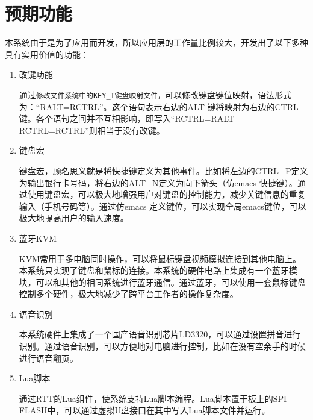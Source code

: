 \section{预期功能}
本系统由于是为了应用而开发，所以应用层的工作量比例较大，开发出了以下多种具有实用价值的功能：
\begin{enumerate}
\item 改键功能

通过\verb|修改文件系统中的KEY_T键盘映射文件，|可以修改键盘键位映射，语法形式为：“RALT=RCTRL”。这个语句表示右边的ALT 键将映射为右边的CTRL键。各个语句之间并不互相影响，即写入“RCTRL=RALT RCTRL=RCTRL”则相当于没有改键。

\item 键盘宏

键盘宏，顾名思义就是将快捷键定义为其他事件。比如将左边的CTRL+P定义为输出银行卡号码，将右边的ALT+N定义为向下箭头（仿\gls{emacs} 快捷键）。通过使用键盘宏，可以极大地增强用户对键盘的控制能力，减少关键信息的重复输入（手机号码等）。通过仿\gls{emacs} 定义键位，可以实现全局emacs键位，可以极大地提高用户的输入速度。

\item 蓝牙KVM

  \gls{KVM}常用于多电脑同时操作，可以将鼠标键盘视频模拟连接到其他电脑上。本系统只实现了键盘和鼠标的连接。本系统的硬件电路上集成有一个蓝牙模块，可以和其他的相同系统进行蓝牙通信。通过蓝牙，可以使用一套鼠标键盘控制多个硬件，极大地减少了跨平台工作者的操作复杂度。

\item 语音识别

本系统硬件上集成了一个国产语音识别芯片LD3320，可以通过设置拼音进行识别。通过语音识别，可以方便地对电脑进行控制，比如在没有空余手的时候进行语音翻页。



\item Lua脚本

通过RTT的Lua组件，使系统支持Lua脚本编程。Lua脚本置于板上的SPI FLASH中，可以通过虚拟U盘接口在其中写入Lua脚本文件并运行。

\end{enumerate}












